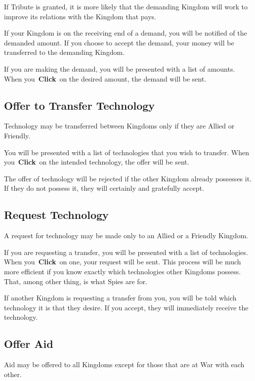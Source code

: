 If Tribute is granted, it is more likely that the demanding Kingdom will work to improve its relations with the Kingdom that pays.

If your Kingdom is on the receiving end of a demand, you will be notified of the demanded amount. If you choose to accept the demand, your money will be transferred to the demanding Kingdom.

If you are making the demand, you will be presented with a list of amounts. When you \textbf{Click} on the desired amount, the demand will be sent.

\subsection{Offer to Transfer Technology}

Technology may be transferred between Kingdoms only if they are Allied or Friendly.

You will be presented with a list of technologies that you wish to transfer. When you \textbf{Click} on the intended technology, the offer will be sent.

The offer of technology will be rejected if the other Kingdom already possesses it. If they do not possess it, they will certainly and gratefully accept.

\subsection{Request Technology}

A request for technology may be made only to an Allied or a Friendly Kingdom.

If you are requesting a transfer, you will be presented with a list of technologies. When you \textbf{Click} on one, your request will be sent. This process will be much more efficient if you know exactly which technologies other Kingdoms possess. That, among other thing, is what Spies are for.

If another Kingdom is requesting a transfer from you, you will be told which technology it is that they desire. If you accept, they will immediately receive the technology.

\subsection{Offer Aid}

Aid may be offered to all Kingdoms except for those that are at War with each other.


